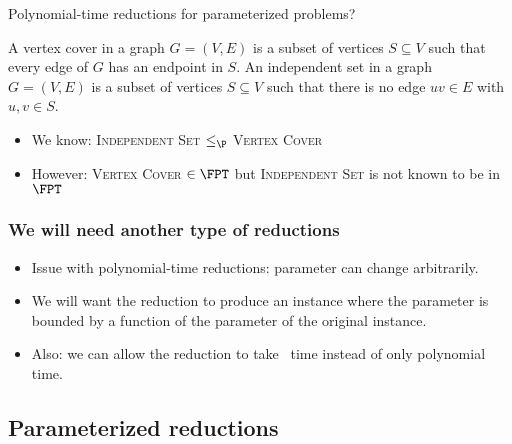 \begin{frame}{Polynomial-time reductions for parameterized problems?}

 \noindent
 A \alert{vertex cover} in a graph $G=(V,E)$ is a subset of vertices $S\subseteq V$ such that every edge of $G$ has an endpoint in $S$.
%
 \noindent
 An \alert{independent set} in a graph $G=(V,E)$ is a subset of vertices $S\subseteq V$ such that there is no edge $uv\in E$ with $u,v\in S$.
 
 \pause
 \begin{itemize}
  \item We know: \textsc{Independent Set} $\le_\P$ \textsc{Vertex Cover}
  \item However: \textsc{Vertex Cover} $\in \FPT$ but \textsc{Independent Set} is not known to be in $\FPT$
 \end{itemize}

\end{frame}

\begin{frame}
 \frametitle{We will need another type of reductions}
 
 \begin{itemize}
  \item Issue with polynomial-time reductions: parameter can change arbitrarily.
  \pause
  \item We will want the reduction to produce an instance where the parameter is bounded by a function of the parameter of the original instance.
  \smallskip
  \pause
  \item Also: we can allow the reduction to take \FPT\ time instead of only polynomial time.
 \end{itemize}
 
\end{frame}


\subsection{Parameterized reductions}


